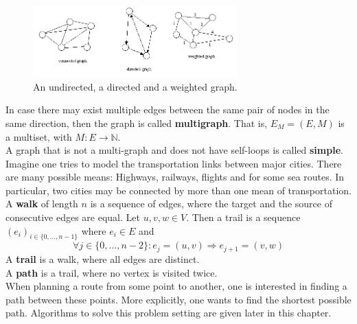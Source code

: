         \begin{figure}
         \begin{center}
          \includegraphics[keepaspectratio,width=0.7\textwidth, height=0.3\textheight]{img/graph_di_we.png}
         \end{center}
          \caption{An undirected, a directed and a weighted graph.}\label{di-we}
        \end{figure}
            
            In case there may exist multiple edges between the same pair of nodes in the same direction, then the graph is called \textbf{multigraph}. 
            That is, $E_M = (E, M)$ is a multiset, with $M: E \rightarrow \mathbb{N}$. \\
            A graph that is not a multi-graph and does not have self-loops is called \textbf{simple}. \\
            
            Imagine one tries to model the transportation links between major cities. 
            There are many possible means: Highways, railways, flights and for some sea routes. 
            In particular, two cities may be connected by more than one mean of transportation.\\
            
            A \textbf{walk} of length $n$ is a sequence of edges, where the target and the source of consecutive edges are equal. Let $u,v,w \in V$. Then a trail is a sequence $(e_i)_{i \in \{0, \dots, n-1\}}$ where $e_i \in E$ and
            \[ \forall j \in \{0, \dots, n-2\}: e_j = (u, v) \Rightarrow e_{j+1} = (v, w)\] 
            A \textbf{trail} is a walk, where all edges are distinct. \\
            A \textbf{path} is a trail, where no vertex is visited twice.\\
            
            When planning a route from some point to another, one is interested in finding a path between these points.
            More explicitly, one wants to find the shortest possible path. 
            Algorithms to solve this problem setting are given later in this chapter. \\
            
